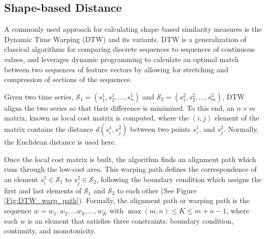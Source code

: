 \subsection{Shape-based Distance}
\label{sec:ShapeBasedDistance}

A commonly used approach for calculating shape--based similarity measures is the Dynamic Time Warping (DTW) \cite{Sakoe1978} and its variants. DTW is a generalization of classical algorithms for comparing discrete sequences to sequences of continuous values, and leverages dynamic programming to calculate an optimal match between two sequences of feature vectors by allowing for stretching and compression of sections of the sequences. 

Given two time series, $\mathcal{S}_{1} =\left(s^{1}_{1}, s^{1}_{2}, \ldots, s^{1}_{n}\right)$ and $\mathcal{S}_{2} = \left(s^{2}_{1}, s^{2}_{2}, \ldots, s^{2}_{m}\right)$, DTW aligns the two series so that their difference is minimized. To this end, an $n \times m$ matrix, known as local cost matrix is computed, where the $(i, j)$ element of the matrix contains the distance $d(s^{1}_{i}, s^{2}_{j})$ between two points $s^{1}_{i}$, and $s^{2}_{j}$. Normally, the Euclidean distance is used here.

Once the local cost matrix is built, the algorithm finds an alignment path which runs through the low-cost area. This warping path defines the correspondence of an element $s^{1}_{i} \in \mathcal{S}_{1}$ to $s^{2}_{j} \in \mathcal{S}_{2}$, following the boundary condition which assigns the first and last elements of $\mathcal{S}_{1}$ and $\mathcal{S}_{2}$ to each other (See Figure \ref{Fig:DTW_warp_path}). Formally, the alignment path or warping path is the sequence $w = w_{1} , w_{2}, \ldots w_{k}, \ldots, w_{K}$ with $\max(m, n) \leq K \leq m + n-1$, where each $w$ is an element that satisfies three constraints: boundary condition, continuity, and monotonicity. 

